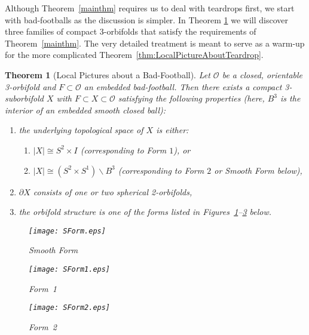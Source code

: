 \documentclass[12pt,reqno]{amsart}
\theoremstyle{plain}
\theoremstyle{definition}
\numberwithin{subcase}{case}
\theoremstyle{plain}
\newtheorem{thm}{Theorem}[section]  %
\theoremstyle{definition}
\def\scl[#1][#2]{{\scalebox{#1}{#2}}}
\def\vp{v_{+}}
\def\vm{v_{-}}
\newcommand{\OO}{\mathcal{O}}
\begin{document}
Although Theorem~\ref{mainthm} requires us to deal with teardrops first, we start with bad-footballs as the discussion is simpler.  In Theorem \ref{localfootball} we will discover three families of compact 3-orbifolds that satisfy the requirements of Theorem~\ref{mainthm}. The very detailed treatment is meant to serve as a warm-up for the more complicated Theorem~\ref{thm:LocalPictureAboutTeardrop}.

\begin{thm}[Local Pictures about a Bad-Football] 
\label{localfootball}
Let \(\OO\) be a closed, orientable 3-orbifold and \(F \subset \OO\) an embedded bad-football.  Then there exists a compact 3-suborbifold $X$ with $F \subset X \subset \OO$ satisfying the following properties (here, \(B^{3}\) is the interior of an embedded smooth closed ball): 
\begin{enumerate}
\item the underlying topological space of $X$ is either:
	\begin{enumerate}
	\item $|X| \cong S^2\times I$ (corresponding to Form $1$), or
	\item $|X| \cong (S^2\times S^1)\backslash B^3$ (corresponding to Form $2$ or Smooth Form below),
	\end{enumerate}
\item $\partial X$ consists of one or two spherical 2-orbifolds, 
\item the orbifold structure is one of the forms listed in Figures~\ref{figure:football:SmoothForm}--\ref{figure:football:Form2} below.
\end{enumerate}

\begin{figure}[h]
\psfrag{t}{\scl[.7][$S^2(a,b)\times I$]}
\psfrag{3}{\scl[.7][$b$]}
\psfrag{2}{\scl[.7][$a$]}
\centerline{\texttt{[image: SForm.eps]}}
\caption{Smooth Form}
\label{figure:football:SmoothForm}
\end{figure}

\begin{figure}[h]
\psfrag{1}{\scl[.7][$S^2(a,a_2,a_3)$]}
\psfrag{3}{\scl[.7][$S^2(a,a_2',a_3')$]}
\psfrag{2}{\scl[.7][$S^2(a,b)$]}
\psfrag{4}{\scl[.7][$\vm$]}
\psfrag{5}{\scl[.7][$\vp$]}
\centerline{\texttt{[image: SForm1.eps]}}
\caption{Form~1}
\label{figure:football:Form1}
\end{figure}

\begin{figure}[h!]
\psfrag{t}{\scl[.7][$S^2(2,3)\times I$]}
\psfrag{3}{\scl[.7][$b=3$]}
\psfrag{2}{\scl[.7][$a^{*}=2$]}
\psfrag{a}{\scl[.7][$a=2$]}
\centerline{\texttt{[image: SForm2.eps]}}
\caption{Form~2}
\label{figure:football:Form2}
\end{figure}
\end{thm}
\end{document}
